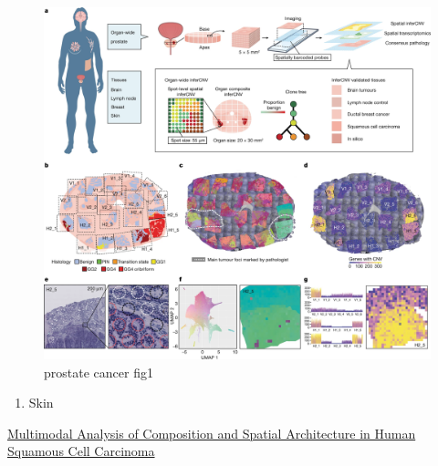\documentclass[
]{book}
\providecommand{\tightlist}{%
  \setlength{\itemsep}{0pt}\setlength{\parskip}{0pt}}
\begin{document}
\begin{figure}
\centering
\includegraphics{./figs/spatialDatasets/prostate_Fig1_HTML.webp}
\caption{prostate cancer fig1}
\end{figure}

\begin{enumerate}
\def\labelenumi{\arabic{enumi}.}
\setcounter{enumi}{6}
\tightlist
\item
  Skin
\end{enumerate}

\href{https://www.cell.com/cell/fulltext/S0092-8674(20)30672-3?_returnURL=https\%3A\%2F\%2Flinkinghub.elsevier.com\%2Fretrieve\%2Fpii\%2FS0092867420306723\%3Fshowall\%3Dtrue}{Multimodal Analysis of Composition and Spatial Architecture in Human Squamous Cell Carcinoma}
\end{document}
